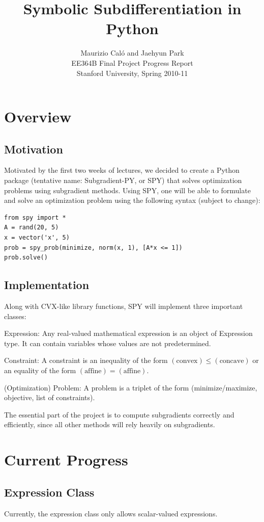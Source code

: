 \documentclass[12pt]{article}
\title{Symbolic Subdifferentiation in Python}
\author{Maurizio Cal\'o and Jaehyun Park\\
EE364B Final Project Progress Report\\
Stanford University, Spring 2010-11}
\begin{document}
\maketitle

\section{Overview}
\subsection{Motivation}
Motivated by the first two weeks of lectures, we decided to create a
Python package (tentative name: Subgradient-PY, or SPY) that solves
optimization problems using subgradient methods. Using SPY, one will
be able to formulate and solve an optimization problem using the
following syntax (subject to change):
\begin{verbatim}
from spy import *
A = rand(20, 5)
x = vector('x', 5)
prob = spy_prob(minimize, norm(x, 1), [A*x <= 1])
prob.solve()
\end{verbatim}

\subsection{Implementation}
Along with CVX-like library functions, SPY will implement three
important classes:
\BIT
\item Expression: Any real-valued mathematical expression is an object
of Expression type. It can contain variables whose values are not
predetermined.
\item Constraint: A constraint is an inequality of the form
$(\text{convex}) \le (\text{concave})$ or an equality of the form
$(\text{affine}) = (\text{affine})$.
\item (Optimization) Problem: A problem is a triplet of the form (minimize/maximize, objective, list of constraints).
\EIT

The essential part of the project is to compute subgradients correctly
and efficiently, since all other methods will rely heavily on subgradients.

\section{Current Progress}
\subsection{Expression Class}
Currently, the expression class only allows scalar-valued expressions.
\end{document}
